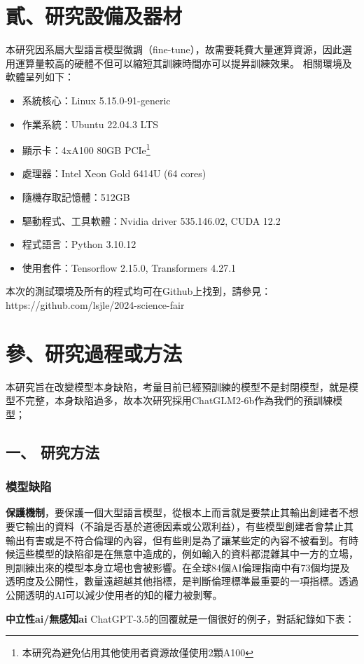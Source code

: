 \documentclass[8pt,a4paper,新細明體,UTF8,natbib]{article}
\begin{document}
\begin{CJK*}{UTF8}{bsmi}
	\section{貳、研究設備及器材}
	本研究因系屬大型語言模型微調（fine-tune），故需要耗費大量運算資源，因此選用運算量較高的硬體不但可以縮短其訓練時間亦可以提昇訓練效果。
	相關環境及軟體呈列如下：
	\begin{itemize}
		\item 系統核心：Linux 5.15.0-91-generic
		\item 作業系統：Ubuntu 22.04.3 LTS
		\item 顯示卡：4xA100 80GB PCIe\footnote{本研究為避免佔用其他使用者資源故僅使用2顆A100}
		\item 處理器：Intel Xeon Gold 6414U (64 cores)
		\item 隨機存取記憶體：512GB
		\item 驅動程式、工具軟體：Nvidia driver 535.146.02, CUDA 12.2
		\item 程式語言：Python 3.10.12
		\item 使用套件：Tensorflow 2.15.0, Transformers 4.27.1
	\end{itemize}	
	本次的測試環境及所有的程式均可在Github上找到，請參見：https://github.com/lsjle/2024-science-fair
	\section{參、研究過程或方法}
	本研究旨在改變模型本身缺陷，考量目前已經預訓練的模型不是封閉模型，就是模型不完整，本身缺陷過多，故本次研究採用ChatGLM2-6b作為我們的預訓練模型；
	\subsection{一、 研究方法}
	\subsubsection{模型缺陷}
	\textbf{保護機制}，要保護一個大型語言模型，從根本上而言就是要禁止其輸出創建者不想要它輸出的資料（不論是否基於道德因素或公眾利益），有些模型創建者會禁止其輸出有害或是不符合倫理的內容，但有些則是為了讓某些定的內容不被看到。有時候這些模型的缺陷卻是在無意中造成的，例如輸入的資料都混雜其中一方的立場，則訓練出來的模型本身立場也會被影響。在全球84個AI倫理指南中有73個均提及透明度及公開性，數量遠超越其他指標，是判斷倫理標準最重要的一項指標。透過公開透明的AI可以減少使用者的知的權力被剝奪。\cite{Jobin2019}
	
	\textbf{中立性ai/無感知ai}
	ChatGPT-3.5的回覆就是一個很好的例子，對話紀錄如下表：


\end{CJK*}
\end{document}

